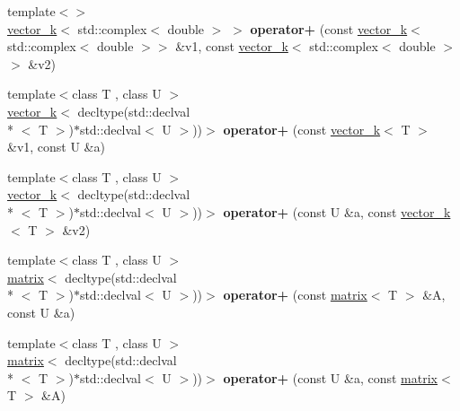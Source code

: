 \begin{DoxyCompactItemize}
\item 
\hypertarget{namespacekeycpp_ade9508aa24d2496bd63dcdb72229c8b0}{{\footnotesize template$<$$>$ }\\\hyperlink{classkeycpp_1_1vector__k}{vector\-\_\-k}$<$ std\-::complex$<$ double $>$ $>$ {\bfseries operator+} (const \hyperlink{classkeycpp_1_1vector__k}{vector\-\_\-k}$<$ std\-::complex$<$ double $>$$>$ \&v1, const \hyperlink{classkeycpp_1_1vector__k}{vector\-\_\-k}$<$ std\-::complex$<$ double $>$$>$ \&v2)}\label{namespacekeycpp_ade9508aa24d2496bd63dcdb72229c8b0}

\item 
\hypertarget{namespacekeycpp_a68fe0fe851bce021be6a0609da7df82d}{{\footnotesize template$<$class T , class U $>$ }\\\hyperlink{classkeycpp_1_1vector__k}{vector\-\_\-k}$<$ decltype(std\-::declval\\*
$<$ T $>$)$\ast$std\-::declval$<$ U $>$))$>$ {\bfseries operator+} (const \hyperlink{classkeycpp_1_1vector__k}{vector\-\_\-k}$<$ T $>$ \&v1, const U \&a)}\label{namespacekeycpp_a68fe0fe851bce021be6a0609da7df82d}

\item 
\hypertarget{namespacekeycpp_af28312b8c309091f03e373e1ae5f3d46}{{\footnotesize template$<$class T , class U $>$ }\\\hyperlink{classkeycpp_1_1vector__k}{vector\-\_\-k}$<$ decltype(std\-::declval\\*
$<$ T $>$)$\ast$std\-::declval$<$ U $>$))$>$ {\bfseries operator+} (const U \&a, const \hyperlink{classkeycpp_1_1vector__k}{vector\-\_\-k}$<$ T $>$ \&v2)}\label{namespacekeycpp_af28312b8c309091f03e373e1ae5f3d46}

\item 
\hypertarget{namespacekeycpp_adff86e062c6497110b7505b0ef715c2c}{{\footnotesize template$<$class T , class U $>$ }\\\hyperlink{classkeycpp_1_1matrix}{matrix}$<$ decltype(std\-::declval\\*
$<$ T $>$)$\ast$std\-::declval$<$ U $>$))$>$ {\bfseries operator+} (const \hyperlink{classkeycpp_1_1matrix}{matrix}$<$ T $>$ \&A, const U \&a)}\label{namespacekeycpp_adff86e062c6497110b7505b0ef715c2c}

\item 
\hypertarget{namespacekeycpp_a4b4a64905c9d681c174b2dfcfba272c4}{{\footnotesize template$<$class T , class U $>$ }\\\hyperlink{classkeycpp_1_1matrix}{matrix}$<$ decltype(std\-::declval\\*
$<$ T $>$)$\ast$std\-::declval$<$ U $>$))$>$ {\bfseries operator+} (const U \&a, const \hyperlink{classkeycpp_1_1matrix}{matrix}$<$ T $>$ \&A)}\label{namespacekeycpp_a4b4a64905c9d681c174b2dfcfba272c4}


\end{DoxyCompactItemize}
